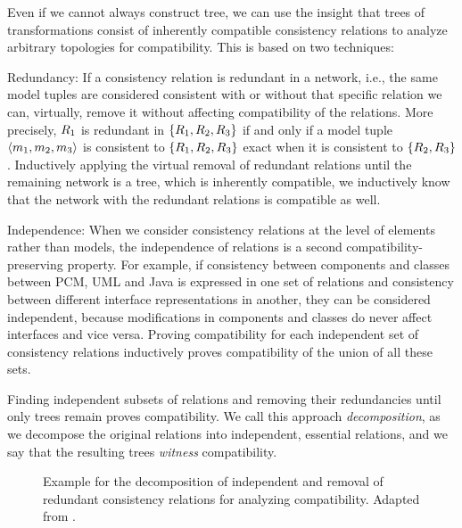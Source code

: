 Even if we cannot always construct tree, we can use the insight that trees of transformations consist of inherently compatible consistency relations to analyze arbitrary topologies for compatibility.
This is based on two techniques:
\begin{properdescription}
    \item[Redundancy:] If a consistency relation is redundant in a network, i.e., the same model tuples are considered consistent with or without that specific relation we can, virtually, remove it without affecting compatibility of the relations. More precisely, $R_{1}$ is redundant in $\{ R_{1}, R_{2}, R_{3} \}$ if and only if a model tuple $\langle m_{1}, m_{2}, m_{3} \rangle$ is consistent to $\{ R_{1}, R_{2}, R_{3} \}$ exact when it is consistent to $\{ R_{2}, R_{3} \}$.
    Inductively applying the virtual removal of redundant relations until the remaining network is a tree, which is inherently compatible, we inductively know that the network with the redundant relations is compatible as well.
    \item[Independence:] When we consider consistency relations at the level of elements rather than models, the independence of relations is a second compatibility-preserving property.
    For example, if consistency between components and classes between \gls{PCM}, UML and Java is expressed in one set of relations and consistency between different interface representations in another, they can be considered independent, because modifications in components and classes do never affect interfaces and vice versa.
    Proving compatibility for each independent set of consistency relations inductively proves compatibility of the union of all these sets.
\end{properdescription}
Finding independent subsets of relations and removing their redundancies until only trees remain proves compatibility.
We call this approach \emph{decomposition}, as we decompose the original relations into independent, essential relations, and we say that the resulting trees \emph{witness} compatibility.

\begin{figure}
    \centering
    
    \caption[Exemplary overview of compatibility analysis idea]{Example for the decomposition of independent and removal of redundant consistency relations for analyzing compatibility. Adapted from .}
    \label{fig:correctness:decomposition}
\end{figure}

